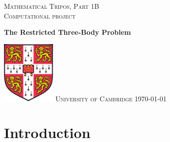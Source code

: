 \documentclass[11pt]{article}
\begin{document}
\begin{titlepage} %
	
	\center %
	
	\vspace*{3cm}

	\textsc{Mathematical Tripos, Part 1B}\\
	\textsc{Computational project}
	\begin{center}
      {\huge\bfseries The Restricted Three-Body Problem\\[0.4cm]
}     \end{center}
	
	\vfill
	\vfill\vfill
	
	\includegraphics*[width = 2.675cm, height = 3.1cm]{coat.png}
	\vfill
	\textsc{University of Cambridge}
	\vspace*{\fill}
	\vfill\vfill
	{\large\today} 
	\vfill
\end{titlepage}
\section{Introduction}
\end{document}
